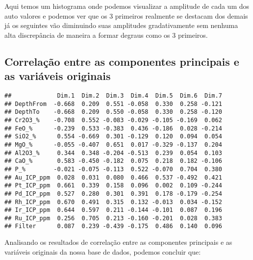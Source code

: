 \documentclass[
]{article}
\begin{document}
Aqui temos um histograma onde podemos visualizar a amplitude de cada um dos auto valores e podemos ver que os 3 primeiros realmente se destacam dos demais já os seguintes vão diminuindo suas amplitudes gradativamente sem nenhuma alta discrepância de maneira a formar degraus como os 3 primeiros.

\hypertarget{correlauxe7uxe3o-entre-as-componentes-principais-e-as-variuxe1veis-originais}{%
\subsection{Correlação entre as componentes principais e as variáveis originais}\label{correlauxe7uxe3o-entre-as-componentes-principais-e-as-variuxe1veis-originais}}

\begin{verbatim}
##             Dim.1  Dim.2  Dim.3  Dim.4  Dim.5  Dim.6  Dim.7
## DepthFrom  -0.668  0.209  0.551 -0.058  0.330  0.258 -0.121
## DepthTo    -0.668  0.209  0.550 -0.058  0.330  0.258 -0.120
## Cr2O3_%    -0.708  0.552 -0.083 -0.029 -0.105 -0.169  0.062
## FeO_%      -0.239  0.533 -0.383  0.436 -0.186  0.028 -0.214
## SiO2_%      0.554 -0.669  0.301 -0.129  0.120  0.094  0.054
## MgO_%      -0.055 -0.407  0.651  0.017 -0.329 -0.137  0.204
## Al2O3_%     0.344  0.348 -0.204 -0.513  0.239  0.054  0.103
## CaO_%       0.583 -0.450 -0.182  0.075  0.218  0.182 -0.106
## P_%        -0.021 -0.075 -0.113  0.522 -0.070  0.704  0.380
## Au_ICP_ppm  0.028  0.031  0.080  0.466  0.537 -0.492  0.421
## Pt_ICP_ppm  0.661  0.339  0.158  0.096  0.002  0.109 -0.244
## Pd_ICP_ppm  0.527  0.280  0.301  0.391  0.178 -0.179 -0.254
## Rh_ICP_ppm  0.670  0.491  0.315  0.132 -0.013  0.034 -0.152
## Ir_ICP_ppm  0.644  0.597  0.211 -0.144 -0.101  0.087  0.196
## Ru_ICP_ppm  0.256  0.705  0.213 -0.160 -0.201  0.028  0.383
## Filter      0.087  0.239 -0.439 -0.175  0.486  0.140  0.096
\end{verbatim}

Analisando os resultados de correlação entre as componentes principais e as variáveis originais da nossa base de dados, podemos concluir que:
\end{document}
